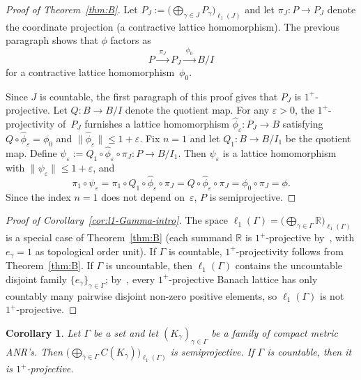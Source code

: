 \documentclass[11pt]{amsart}
\renewcommand{\le}{\leqslant}
\numberwithin{equation}{section}
\newtheorem{corollary}[theorem]{Corollary}
\theoremstyle{definition}
\theoremstyle{remark}
\theoremstyle{plain}
\begin{document}
\begin{proof}[Proof of Theorem~\ref{thm:B}]
Let $P_J:=\bigl(\bigoplus_{\gamma\in J} P_\gamma\bigr)_{\ell_1(J)}$ and let $\pi_J\colon P\to P_J$
denote the coordinate projection (a contractive lattice homomorphism).
The previous paragraph shows that $\phi$ factors as
\[
P \xrightarrow{\;\pi_J\;} P_J \xrightarrow{\;\phi_0\;} B/I
\]
for a contractive lattice homomorphism~$\phi_0$.

Since $J$ is countable, the first paragraph of this proof gives that $P_J$ is
$1^+$-projective.
Let $Q\colon B\to B/I$ denote the quotient map.
For any $\varepsilon>0$, the $1^+$-projectivity of~$P_J$ furnishes
a lattice homomorphism $\widehat\phi_\varepsilon\colon P_J\to B$ satisfying
$Q\circ \widehat\phi_\varepsilon=\phi_0$ and
$\|\widehat\phi_\varepsilon\|\le 1+\varepsilon$.
Fix $n=1$ and let $Q_1\colon B\to B/I_1$ be the quotient map.
Define $\psi_\varepsilon:=Q_1\circ \widehat\phi_\varepsilon\circ \pi_J\colon P\to B/I_1$.
Then $\psi_\varepsilon$ is a lattice homomorphism with
$\|\psi_\varepsilon\|\le 1+\varepsilon$, and
\[
\pi_1\circ \psi_\varepsilon
=\pi_1\circ Q_1\circ \widehat\phi_\varepsilon\circ \pi_J
=Q\circ \widehat\phi_\varepsilon\circ \pi_J
=\phi_0\circ \pi_J
=\phi.
\]
Since the index $n=1$ does not depend on~$\varepsilon$,
$P$ is semiprojective.
\end{proof}

\begin{proof}[Proof of Corollary~\ref{cor:l1-Gamma-intro}]
The space $\ell_1(\Gamma)=\bigl(\bigoplus_{\gamma\in\Gamma}\mathbb R\bigr)_{\ell_1(\Gamma)}$
is a special case of Theorem~\ref{thm:B}
(each summand $\mathbb R$ is $1^+$-projective by~\cite[Corollary~10.6]{dpw},
with $e_\gamma=1$ as topological order unit).
If $\Gamma$ is countable, $1^+$-projectivity follows from Theorem~\ref{thm:B}.
If $\Gamma$ is uncountable, then $\ell_1(\Gamma)$ contains the uncountable
disjoint family $\{e_\gamma\}_{\gamma\in\Gamma}$;
by~\cite[Corollary~10.5]{dpw}, every $1^+$-projective Banach lattice has
only countably many pairwise disjoint non-zero positive elements,
so $\ell_1(\Gamma)$ is not $1^+$-projective.
\end{proof}

\begin{corollary}\label{cor:l1-sum-CK-anr}
Let\/ $\Gamma$ be a set and let\/ $(K_\gamma)_{\gamma\in\Gamma}$ be a family
of compact metric ANR's.
Then $\bigl(\bigoplus_{\gamma\in\Gamma} C(K_\gamma)\bigr)_{\ell_1(\Gamma)}$ is semiprojective.
If\/ $\Gamma$ is countable, then it is $1^+$-projective.
\end{corollary}
\end{document}
